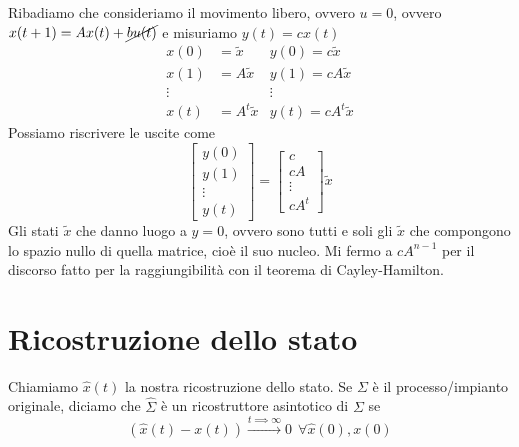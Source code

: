 Ribadiamo che consideriamo il movimento libero, ovvero $u=0$, ovvero $x(t+1) =Ax(t) +\cancel{bu(t)}$ e misuriamo $y(t) =cx(t)$
\begin{equation*}
	\begin{aligned}
		x(0)   & =\tilde{x}    & y(0) =c\tilde{x}    \\
		x(1)   & =A\tilde{x}   & y(1) =cA\tilde{x}   \\
		\vdots &               & \vdots              \\
		x(t)   & =A^t\tilde{x} & y(t) =cA^t\tilde{x} 
	\end{aligned}
\end{equation*}
Possiamo riscrivere le uscite come
\begin{equation*}
	\begin{bmatrix}
		y(0)   \\
		y(1)   \\
		\vdots \\
		y(t)   
	\end{bmatrix} =\begin{bmatrix}
	c\\
	cA\\
	\vdots \\
	cA^t
	\end{bmatrix}\tilde{x}
\end{equation*}
Gli stati $\tilde{x}$ che danno luogo a $y=0$, ovvero sono tutti e soli gli $\tilde{x}$ che compongono lo spazio nullo di quella matrice, cioè il suo nucleo. Mi fermo a $cA^{n-1}$ per il discorso fatto per la raggiungibilità con il teorema di Cayley-Hamilton.

\section{Ricostruzione dello stato}

Chiamiamo $\hat{x}(t)$ la nostra ricostruzione dello stato. Se $\Sigma $ è il processo/impianto originale, diciamo che $\hat{\Sigma }$ è un ricostruttore asintotico di $\Sigma $ se
\begin{equation*}
	(\hat{x}(t) -x(t))\xrightarrow{t\implies \infty } 0\ \ \forall \hat{x}(0) ,x(0)
\end{equation*}

